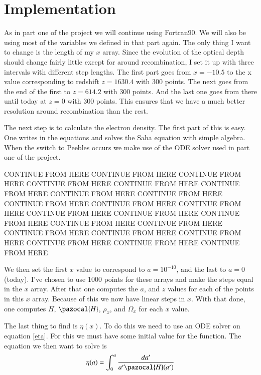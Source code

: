 \documentclass{aa}   %
\begin{document}
\section{Implementation}\label{sec:Imp}
As in part one of the project we will continue using Fortran90.
We will also be using most of the variables we defined in that part again.
The only thing I want to change is the length of my $x$ array. 
Since the evolution of the optical depth should change fairly little except for around recombination, I set it up with three intervals with different step lengths. The first part goes from $x = -10.5$ to the x value corresponding to redshift $z= 1630.4$ with 300 points. The next goes from the end of the first to $z = 614.2$ with 300 points. And the last one goes from there until today at $z = 0$ with 300 points. This ensures that we have a much better resolution around recombination than the rest.

The next step is to calculate the electron density. The first part of this is easy. One writes in the equations and solves the Saha equation with simple algebra. When the switch to Peebles occurs we make use of the ODE solver used in part one of the project. 


CONTINUE FROM HERE CONTINUE FROM HERE CONTINUE FROM HERE CONTINUE FROM HERE CONTINUE FROM HERE CONTINUE FROM HERE CONTINUE FROM HERE CONTINUE FROM HERE CONTINUE FROM HERE CONTINUE FROM HERE CONTINUE FROM HERE CONTINUE FROM HERE CONTINUE FROM HERE CONTINUE FROM HERE CONTINUE FROM HERE CONTINUE FROM HERE CONTINUE FROM HERE CONTINUE FROM HERE CONTINUE FROM HERE CONTINUE FROM HERE CONTINUE FROM HERE CONTINUE FROM HERE 

We then set the first $x$ value to correspond to $a= 10^{-10}$, and the last to $a=0$ (today). 
I've chosen to use 1000 points for these arrays and make the steps equal in the $x$ array. After that one computes the $a$, and $z$ values for each of the points in this $x$ array. Because of this we now have linear steps in $x$.
With that done, one computes $H$, $\pazocal{H}$, $\rho_x$, and $\Omega_x$ for each $x$ value.

The last thing to find is $\eta(x)$. 
To do this we need to use an ODE solver on equation \ref{eta}. For this we must have some initial value for the function. 
The equation we then want to solve is 
\begin{equation}
 \eta(a) = \int_0^a \frac{da'}{a'\pazocal{H}(a')}
\end{equation}
\end{document}
